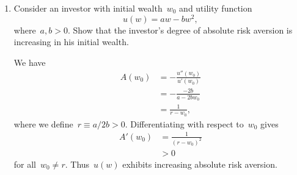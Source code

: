 \begin{enumerate}
	\item
	Consider an investor with initial wealth~$w_0$ and utility function
	\[ u(w)=aw-bw^2, \]
	where~$a,b>0$.
	Show that the investor's degree of absolute risk aversion is increasing in his initial wealth.
	\begin{solution}
		We have
		\begin{align}
			A(w_0)
			&= -\frac{u''(w_0)}{u'(w_0)}\\
			&= -\frac{-2b}{a-2bw_0}\\
			&= \frac{1}{r-w_0},
		\end{align}
		where we define~$r\equiv a/2b>0$.
		Differentiating with respect to~$w_0$ gives
		\begin{align}
			A'(w_0)
			&= \frac{1}{(r-w_0)^2}\\
			&> 0
		\end{align}
		for all~$w_0\not=r$.
		Thus~$u(w)$ exhibits increasing absolute risk aversion.
	\end{solution}

\end{enumerate}
